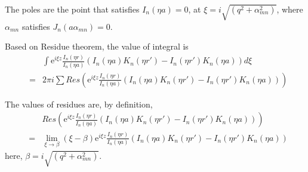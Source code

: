 \documentclass{article}
\begin{document}
The poles are the point that satisfies $I_n(\eta a) = 0$, 
at $\xi = i\sqrt{(q^2 + \alpha_{mn}^2)}$,
where $\alpha_{mn}$ satisfies $J_n(a\alpha_{mn}) = 0$.

Based on Residue theorem, the value of integral is
\begin{eqnarray}
    & & \int \mathrm{e}^{i\xi z}\frac{I_n(\eta r)}{I_n(\eta a)}
        \left(I_n(\eta a)K_n(\eta r') - I_n(\eta r')K_n(\eta a)\right)d\xi \nonumber \\
    &=& 2\pi i\sum Res(\mathrm{e}^{i\xi z}\frac{I_n(\eta r)}{I_n(\eta a)}
        \left(I_n(\eta a)K_n(\eta r') - I_n(\eta r')K_n(\eta a)\right))
\end{eqnarray}

The values of residues are, by definition,
\begin{eqnarray}
    & & Res(\mathrm{e}^{i\xi z}\frac{I_n(\eta r)}{I_n(\eta a)}
        \left(I_n(\eta a)K_n(\eta r') - I_n(\eta r')K_n(\eta a)\right)) \nonumber \\
    &=& \lim_{\xi \to \beta}
        (\xi - \beta)
        \mathrm{e}^{i\xi z}\frac{I_n(\eta r)}{I_n(\eta a)}
        \left(I_n(\eta a)K_n(\eta r') - I_n(\eta r')K_n(\eta a)\right)
\end{eqnarray}
here, $\beta = i\sqrt{(q^2 + \alpha_{mn}^2)}$.
\end{document}

